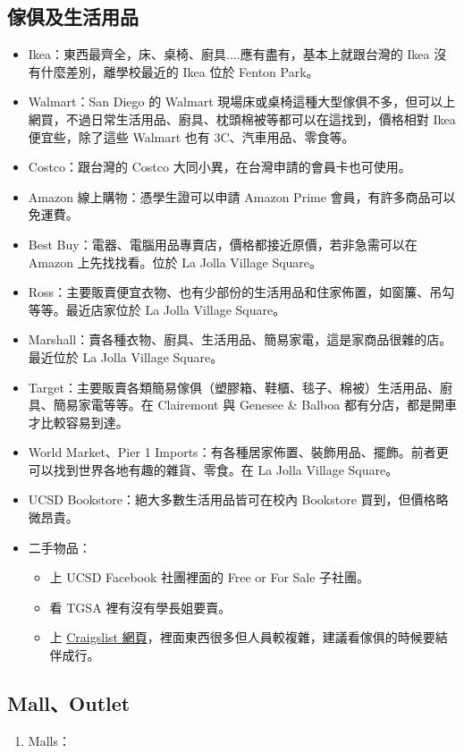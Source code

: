 \documentclass[10pt,a4paper]{book}
\begin{document}
\begin{CJK}{UTF8}{bkai}
\subsection{傢俱及生活用品}
\begin{itemize}
\item Ikea：東西最齊全，床、桌椅、廚具....應有盡有，基本上就跟台灣的 Ikea 沒有什麼差別，離學校最近的 Ikea 位於 Fenton Park。
\item Walmart：San Diego 的 Walmart 現場床或桌椅這種大型傢俱不多，但可以上網買，不過日常生活用品、廚具、枕頭棉被等都可以在這找到，價格相對 Ikea 便宜些，除了這些 Walmart 也有 3C、汽車用品、零食等。
\item Costco：跟台灣的 Costco 大同小異，在台灣申請的會員卡也可使用。
\item Amazon 線上購物：憑學生證可以申請 Amazon Prime 會員，有許多商品可以免運費。
\item Best Buy：電器、電腦用品專賣店，價格都接近原價，若非急需可以在 Amazon 上先找找看。位於 La Jolla Village Square。
\item Ross：主要販賣便宜衣物、也有少部份的生活用品和住家佈置，如窗簾、吊勾等等。最近店家位於 La Jolla Village Square。
\item Marshall：賣各種衣物、廚具、生活用品、簡易家電，這是家商品很雜的店。最近位於 La Jolla Village Square。
\item Target：主要販賣各類簡易傢俱（塑膠箱、鞋櫃、毯子、棉被）生活用品、廚具、簡易家電等等。在 Clairemont 與 Genesee \& Balboa 都有分店，都是開車才比較容易到達。
\item World Market、Pier 1 Imports：有各種居家佈置、裝飾用品、擺飾。前者更可以找到世界各地有趣的雜貨、零食。在 La Jolla Village Square。
\item UCSD Bookstore：絕大多數生活用品皆可在校內 Bookstore 買到，但價格略微昂貴。
\item 二手物品：
    \begin{itemize}
    \item 上 UCSD Facebook 社團裡面的 Free or For Sale 子社團。
    \item 看 TGSA 裡有沒有學長姐要賣。
    \item 上 \href{http://sandiego.craigslist.org/}{Craigslist 網頁}，裡面東西很多但人員較複雜，建議看傢俱的時候要結伴成行。
    \end{itemize}     
\end{itemize}

\subsection{Mall、Outlet}
\begin{enumerate}
\item Malls：


\end{enumerate}
\end{CJK}
\end{document}
